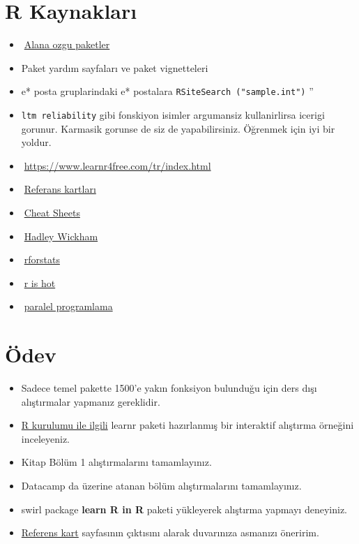 \documentclass[
  oneside]{book}
\providecommand{\tightlist}{%
  \setlength{\itemsep}{0pt}\setlength{\parskip}{0pt}}
\begin{document}
\hypertarget{r-kaynaklarux131}{%
\section{R Kaynakları}\label{r-kaynaklarux131}}

\begin{itemize}
\tightlist
\item
  🔗\href{https://cran.r*\%20project.org/web/views/Psychometrics.html}{Alana ozgu paketler}
\item
  Paket yardım sayfaları ve paket vignetteleri
\item
  e* posta gruplarindaki e* postalara \texttt{RSiteSearch\ ("sample.int")} ''
\item
  \texttt{ltm\ reliability} gibi fonskiyon isimler argumansiz kullanirlirsa icerigi gorunur. Karmasik gorunse de siz de yapabilirsiniz. Öğrenmek için iyi bir yoldur.
\item
  🔗\url{https://www.learnr4free.com/tr/index.html}
\item
  🔗\href{https://cran.r-project.org/doc/contrib/Short-refcard.pdf}{Referans kartları}
\item
  🔗\href{https://www.rstudio.com/resources/cheatsheets/}{Cheat Sheets}
\item
  🔗\href{https://hadley.nz/}{Hadley Wickham}
\item
  🔗\href{http://r4stats.com/}{rforstats}
\item
  🔗\href{https://blog.revolutionanalytics.com/r*\%20is*\%20hot/}{r is hot}
\item
  🔗\href{http://www.matthewckeller.com/}{paralel programlama}
\end{itemize}

\hypertarget{uxf6dev-1}{%
\section{Ödev}\label{uxf6dev-1}}

\begin{itemize}
\item
  Sadece temel pakette 1500'e yakın fonksiyon bulunduğu için ders dışı alıştırmalar yapmanız gereklidir.
\item
  \href{https://learnr-examples.shinyapps.io/ex-setup-r/}{R kurulumu ile ilgili} learnr paketi hazırlanmış bir interaktif alıştırma örneğini inceleyeniz.
\item
  Kitap Bölüm 1 alıştırmalarını tamamlayınız.
\item
  Datacamp da üzerine atanan bölüm alıştırmalarını tamamlayınız.
\item
  swirl package \textbf{learn R in R} paketi yükleyerek alıştırma yapmayı deneyiniz.
\item
  \href{https://cran.r-project.org/doc/contrib/Short-refcard.pdf}{Referens kart} sayfasının çıktısını alarak duvarınıza asmanızı öneririm.
\end{itemize}
\end{document}
